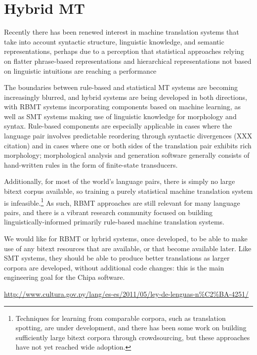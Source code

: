 \section{Hybrid MT}
Recently there has been renewed interest in machine translation systems that
take into account syntactic structure, linguistic knowledge, and semantic
representations, perhaps due to a perception that statistical approaches
relying on flatter phrase-based representations and hierarchical
representations not based on linguistic intuitions are reaching a performance

The boundaries between rule-based and statistical MT systems are becoming
increasingly blurred, and hybrid systems are being developed in both
directions, with RBMT systems incorporating components based on machine
learning, as well as SMT systems making use of linguistic knowledge for
morphology and syntax.
Rule-based components are especially applicable in cases where the language
pair involves predictable reordering through syntactic divergences
(XXX citation)
and in cases where one or both sides of the translation pair exhibits rich
morphology; morphological analysis and generation software generally consists
of hand-written rules in the form of finite-state transducers.

Additionally, for most of the world's language pairs, there is simply no large
bitext corpus available, so training a purely statistical machine translation
system is infeasible.\footnote{Techniques for learning from comparable corpora,
such as translation spotting, are under development, and there has been some
work on building sufficiently large bitext corpora through crowdsourcing, but
these approaches have not yet reached wide adoption.}
As such, RBMT approaches are still relevant for many language pairs, and there
is a vibrant research community focused on building linguistically-informed
primarily rule-based machine translation systems.

We would like for RBMT or hybrid systems, once developed, to be able to make
use of any bitext resources that are available, or that become available later.
Like SMT systems, they should be able to produce better translations as larger
corpora are developed, without additional code changes: this is the main
engineering goal for the Chipa software.

\urldef{\leydelenguas}\url{http://www.cultura.gov.py/lang/es-es/2011/05/ley-de-lenguas-n%C2%BA-4251/}

